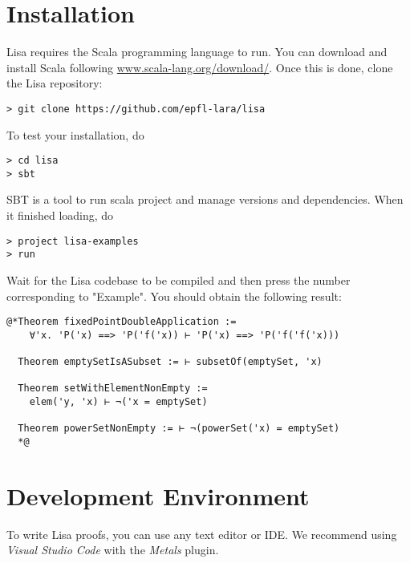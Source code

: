 \section{Installation}
Lisa requires the Scala programming language to run. You can download and install Scala following \url{www.scala-lang.org/download/}. Once this is done, clone the Lisa repository:
\begin{lstlisting}[language=console]
> git clone https://github.com/epfl-lara/lisa
\end{lstlisting}
To test your installation, do
\begin{lstlisting}[language=console]
> cd lisa
> sbt
\end{lstlisting}
SBT is a tool to run scala project and manage versions and dependencies. When it finished loading, do
\begin{lstlisting}[language=console]
> project lisa-examples
> run
\end{lstlisting}
Wait for the Lisa codebase to be compiled and then press the number corresponding to "Example". You should obtain the following result:
\noindent\begin{minipage}{\linewidth}\vspace{1em}
\begin{lstlisting}[language=console]
  @*Theorem fixedPointDoubleApplication := 
    ∀'x. 'P('x) ==> 'P('f('x)) ⊢ 'P('x) ==> 'P('f('f('x)))

  Theorem emptySetIsASubset := ⊢ subsetOf(emptySet, 'x)

  Theorem setWithElementNonEmpty := 
    elem('y, 'x) ⊢ ¬('x = emptySet)

  Theorem powerSetNonEmpty := ⊢ ¬(powerSet('x) = emptySet)
  *@
\end{lstlisting}
\end{minipage}



\section{Development Environment}
To write Lisa proofs, you can use any text editor or IDE. We recommend using \emph{Visual Studio Code} with the \emph{Metals} plugin.

